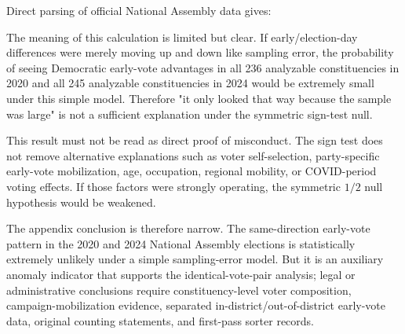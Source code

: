 \documentclass[preprint]{../ieie/IEIE}
\begin{document}
Direct parsing of official National Assembly data gives:

\begin{center}
\scriptsize
{}
\end{center}

The meaning of this calculation is limited but clear. If early/election-day differences were merely moving up and down like sampling error, the probability of seeing Democratic early-vote advantages in all 236 analyzable constituencies in 2020 and all 245 analyzable constituencies in 2024 would be extremely small under this simple model. Therefore "it only looked that way because the sample was large" is not a sufficient explanation under the symmetric sign-test null.

This result must not be read as direct proof of misconduct. The sign test does not remove alternative explanations such as voter self-selection, party-specific early-vote mobilization, age, occupation, regional mobility, or COVID-period voting effects. If those factors were strongly operating, the symmetric \(1/2\) null hypothesis would be weakened.

The appendix conclusion is therefore narrow. The same-direction early-vote pattern in the 2020 and 2024 National Assembly elections is statistically extremely unlikely under a simple sampling-error model. But it is an auxiliary anomaly indicator that supports the identical-vote-pair analysis; legal or administrative conclusions require constituency-level voter composition, campaign-mobilization evidence, separated in-district/out-of-district early-vote data, original counting statements, and first-pass sorter records.
\end{document}
